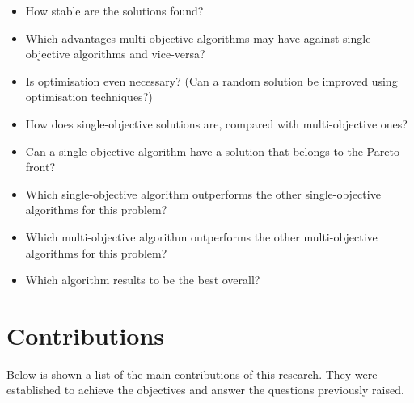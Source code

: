 \begin{itemize}

\item How stable are the solutions found?

\item Which advantages multi-objective algorithms may have against single-objective algorithms and vice-versa?

\item Is optimisation even necessary? (Can a random solution be improved using optimisation techniques?)

\item How does single-objective solutions are, compared with multi-objective ones?

\item Can a single-objective algorithm have a solution that belongs to the Pareto front?

\item Which single-objective algorithm outperforms the other single-objective algorithms for this problem?

\item Which multi-objective algorithm outperforms the other multi-objective algorithms for this problem?

\item Which algorithm results to be the best overall?

\end{itemize}
\clearpage

\section{Contributions}

Below is shown a list of the main contributions of this research. They were established to achieve the objectives and answer the questions previously raised.

